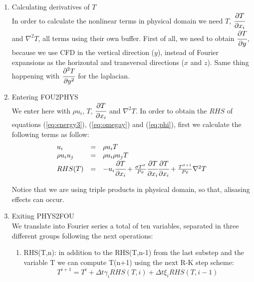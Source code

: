 \documentclass[titlepage,11pt]{article}
\newcommand\ppy[1]{\cfrac{\partial#1}{\partial y}} %
\newcommand\ppi[1]{\cfrac{\partial#1}{\partial x_i}} %
\newcommand\pppy[1]{\cfrac{\partial^2#1}{\partial y^2}} %
\begin{document}
\begin{enumerate}
\item Calculating derivatives of $T$\\
In order to calculate the nonlinear terms in physical domain we need $T$, $\ppi{T}$ and $\nabla^2 T$, all terms using their own buffer. First of all, we need to obtain $\ppy{T}$, because we use CFD in the vertical direction ($y$), instead of Fourier expansions as the horizontal and transversal directions ($x$ and $z$). Same thing happening with $\pppy{T}$ for the laplacian.

\item Entering FOU2PHYS \\
We enter here with $\rho u_i$, $T$, $\ppi{T}$ and $\nabla^2 T$. In order to obtain the $RHS$ of equations (\ref{eq:energy3}), (\ref{eq:omegay}) and (\ref{eq:phi}), first we calculate the following terms as follow:
\begin{equation}
	\begin{array}{lcl}
		u _i &=& \rho u_i T \\
		\rho u_i u_j  &=& \rho u_i \rho u_j T \\
                   RHS(T)&=& -u_i \ppi{T}+\frac{\sigma T^{\sigma}}{Pe}\ppi{T} \ppi{T}+ \frac{T^{\sigma+1}}{Pe} \nabla^2{T}
	\end{array}
\end{equation}

Notice that we are using triple products in physical domain, so that, alisasing effects can occur.

\item Exiting PHYS2FOU \\
We translate into Fourier series a total of ten variables, separated in three different groups following the next operations:

\begin{enumerate}
	\item RHS(T,n): in addition to the RHS(T,n-1) from the last substep and the variable T we can compute T(n+1) using the 					next R-K step scheme:
		\begin{equation}
			T^{i+1}=T^{i}+\Delta t \gamma_i RHS(T,i)+\Delta t \xi_i RHS(T,i-1)
		\end{equation}


\end{enumerate}
\end{enumerate}
\end{document}
